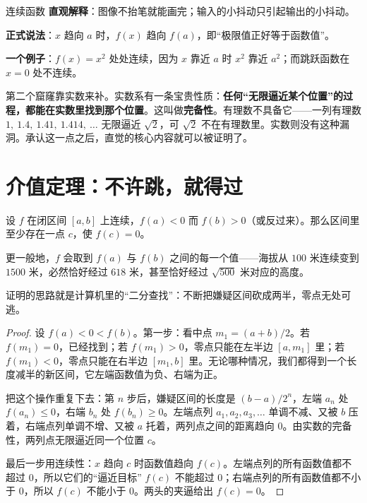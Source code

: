 \begin{shuyu}{连续函数}
\textbf{直观解释}：图像不抬笔就能画完；输入的小抖动只引起输出的小抖动。

\textbf{正式说法}：$x$ 趋向 $a$ 时，$f(x)$ 趋向 $f(a)$，即“极限值正好等于函数值”。

\textbf{一个例子}：$f(x)=x^2$ 处处连续，因为 $x$ 靠近 $a$ 时 $x^2$ 靠近 $a^2$；而跳跃函数在 $x=0$ 处不连续。
\end{shuyu}

第二个窟窿靠实数来补。实数系有一条宝贵性质：\textbf{任何“无限逼近某个位置”的过程，都能在实数里找到那个位置}。这叫做\textbf{完备性}。有理数不具备它——一列有理数 $1,\ 1.4,\ 1.41,\ 1.414,\ \dots$ 无限逼近 $\sqrt{2}$，可 $\sqrt{2}$ 不在有理数里。实数则没有这种漏洞。承认这一点之后，直觉的核心内容就可以被证明了。

\section{介值定理：不许跳，就得过}

\begin{dingli}[介值定理]
设 $f$ 在闭区间 $[a,b]$ 上连续，$f(a)<0$ 而 $f(b)>0$（或反过来）。那么区间里至少存在一点 $c$，使 $f(c)=0$。
\end{dingli}

更一般地，$f$ 会取到 $f(a)$ 与 $f(b)$ 之间的每一个值——海拔从 $100$ 米连续变到 $1500$ 米，必然恰好经过 $618$ 米，甚至恰好经过 $\sqrt{500}$ 米对应的高度。

证明的思路就是计算机里的“二分查找”：不断把嫌疑区间砍成两半，零点无处可逃。

\begin{proof}
设 $f(a)<0<f(b)$。第一步：看中点 $m_1=(a+b)/2$。若 $f(m_1)=0$，已经找到；若 $f(m_1)>0$，零点只能在左半边 $[a,m_1]$ 里；若 $f(m_1)<0$，零点只能在右半边 $[m_1,b]$ 里。无论哪种情况，我们都得到一个长度减半的新区间，它左端函数值为负、右端为正。

把这个操作重复下去：第 $n$ 步后，嫌疑区间的长度是 $(b-a)/2^n$，左端 $a_n$ 处 $f(a_n)\le 0$，右端 $b_n$ 处 $f(b_n)\ge 0$。左端点列 $a_1,a_2,a_3,\dots$ 单调不减、又被 $b$ 压着，右端点列单调不增、又被 $a$ 托着，两列点之间的距离趋向 $0$。由实数的完备性，两列点无限逼近同一个位置 $c$。

最后一步用连续性：$x$ 趋向 $c$ 时函数值趋向 $f(c)$。左端点列的所有函数值都不超过 $0$，所以它们的“逼近目标” $f(c)$ 不能超过 $0$；右端点列的所有函数值都不小于 $0$，所以 $f(c)$ 不能小于 $0$。两头的夹逼给出 $f(c)=0$。
\end{proof}

